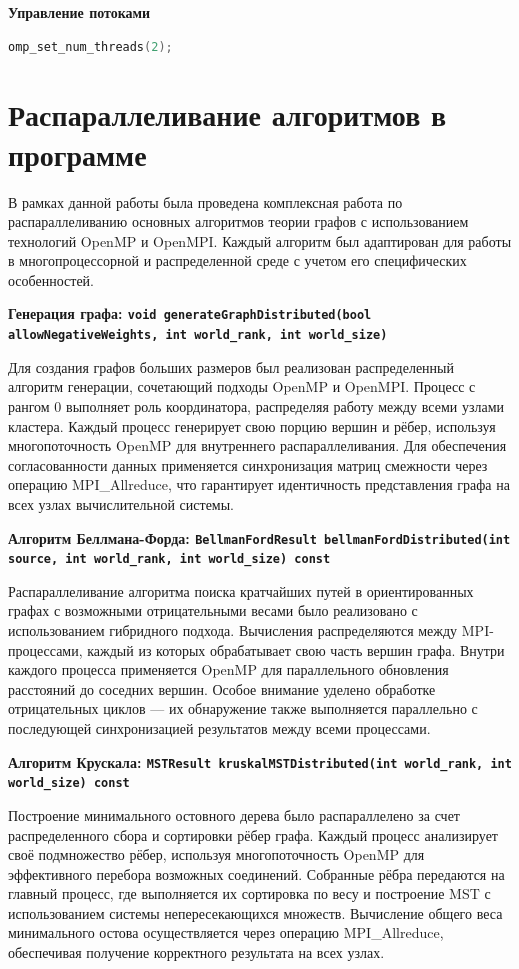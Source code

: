 \documentclass[11pt,a4paper,final]{article}
\begin{document}
\textbf{Управление потоками}
\begin{lstlisting}[caption=Настройка количества потоков OpenMP, label=lst:omp_threads, language=C++]
	omp_set_num_threads(2);
\end{lstlisting}

\newpage
\section{Распараллеливание алгоритмов в программе}

В рамках данной работы была проведена комплексная работа по распараллеливанию основных алгоритмов теории графов с использованием технологий OpenMP и OpenMPI. Каждый алгоритм был адаптирован для работы в многопроцессорной и распределенной среде с учетом его специфических особенностей.

\textbf{Генерация графа: \texttt{void generateGraphDistributed(bool allowNegativeWeights, int world\_rank, int world\_size)}}

Для создания графов больших размеров был реализован распределенный алгоритм генерации, сочетающий подходы OpenMP и OpenMPI. Процесс с рангом 0 выполняет роль координатора, распределяя работу между всеми узлами кластера. Каждый процесс генерирует свою порцию вершин и рёбер, используя многопоточность OpenMP для внутреннего распараллеливания. Для обеспечения согласованности данных применяется синхронизация матриц смежности через операцию MPI\_Allreduce, что гарантирует идентичность представления графа на всех узлах вычислительной системы.

\textbf{Алгоритм Беллмана-Форда: \texttt{BellmanFordResult bellmanFordDistributed(int source, int world\_rank, int world\_size) const}}

Распараллеливание алгоритма поиска кратчайших путей в ориентированных графах с возможными отрицательными весами было реализовано с использованием гибридного подхода. Вычисления распределяются между MPI-процессами, каждый из которых обрабатывает свою часть вершин графа. Внутри каждого процесса применяется OpenMP для параллельного обновления расстояний до соседних вершин. Особое внимание уделено обработке отрицательных циклов — их обнаружение также выполняется параллельно с последующей синхронизацией результатов между всеми процессами.

\textbf{Алгоритм Крускала: \texttt{MSTResult kruskalMSTDistributed(int world\_rank, int world\_size) const}}

Построение минимального остовного дерева было распараллелено за счет распределенного сбора и сортировки рёбер графа. Каждый процесс анализирует своё подмножество рёбер, используя многопоточность OpenMP для эффективного перебора возможных соединений. Собранные рёбра передаются на главный процесс, где выполняется их сортировка по весу и построение MST с использованием системы непересекающихся множеств. Вычисление общего веса минимального остова осуществляется через операцию MPI\_Allreduce, обеспечивая получение корректного результата на всех узлах.
\end{document}
